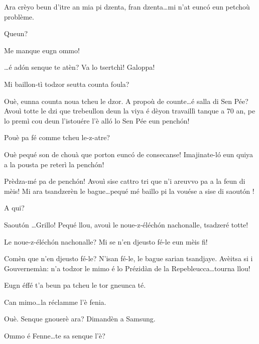 \begin{drama}
\Alicespeaks Ara crèyo beun d'itre an mia pi dzenta, fran dzenta\ldots mi n'at eunc\'o eun petchoù problème.

\Cheriespeaks Queun?

\Alicespeaks Me manque eugn ommo!

\Cheriespeaks \ldots é ad\'on senque te atèn? Va lo tsertchì! Galoppa!




  
\Vioujspeaks Mi baillon-tì todzor seutta counta foula?

\Vioupspeaks Ouè, eunna counta noua tcheu le dzor. A propoù de counte\ldots é salla di Sen Pée? Avouì totte le dzi que trebeullon deun la viya é dèyon travaillì tanque a 70 an, pe lo premì cou deun l'istouére l'è all\'o lo Sen Pée eun pench\'on!

\Vioujspeaks Pouè pa fé comme tcheu le-z-atre?

\Vioupspeaks Ouè pequé son de chouà que porton eunc\'o de consecanse! I\-ma\-ji\-na\-te-l\'o eun quiya a la pousta pe reterì la pench\'on! 

\Vioujspeaks Prèdza-mé pa de pench\'on! Avouì sise cattro tri que n'i areuv\-vo pa a la feun di mèis! Mi ara tsandzerèn le bague\ldots pequé mé baillo pi la vouése a sise di saout\'on !

\Vioupspeaks A qui?

\Vioujspeaks Saout\'on \ldots Grillo! Pequé llou, avouì le noue-z-éléch\'on nachonalle, tsadzeré totte!

\Vioupspeaks Le noue-z-éléch\'on nachonalle? Mi se n'en djeusto fé-le eun mèis fi!

\Vioujspeaks Comèn que n'en djeusto fé-le? N'isan fé-le, le bague sarian tsandjaye. Avèitsa si i Gouvernemàn: n'a todzor le mimo é lo Prézidàn de la Repebleucca\ldots tourna llou!

\Vioupspeaks Eugn éffé t'a beun pa tcheu le tor gneunca té.

\Vioujspeaks{} Can mimo\ldots la réclamme l'è fenia.

\Vioupspeaks Ouè. Senque gnouerè ara? Dimandèn a Samsung.


\Vioupspeaks \og Ommo é Fenne\fg\ldots te sa senque l'è?


\end{drama}
